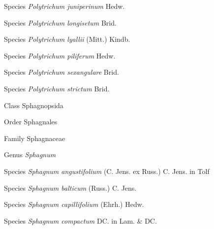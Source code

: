 \documentclass[9pt, article]{memoir}
\begin{document}
\begin{multicols}{2}
\vspace{6pt}\noindent\hspace{36pt}Species \textit{Polytrichum juniperinum} Hedw.


\vspace{6pt}\noindent\hspace{36pt}Species \textit{Polytrichum longisetum} Brid.


\vspace{6pt}\noindent\hspace{36pt}Species \textit{Polytrichum lyallii} (Mitt.) Kindb.


\vspace{6pt}\noindent\hspace{36pt}Species \textit{Polytrichum piliferum} Hedw.


\vspace{6pt}\noindent\hspace{36pt}Species \textit{Polytrichum sexangulare} Brid.


\vspace{6pt}\noindent\hspace{36pt}Species \textit{Polytrichum strictum} Brid.


\vspace{6pt}\noindent\hspace{12pt}Class Sphagnopsida


\vspace{6pt}\noindent\hspace{18pt}Order Sphagnales


\vspace{6pt}\noindent\hspace{24pt}Family Sphagnaceae


\vspace{6pt}\noindent\hspace{30pt}Genus \textit{Sphagnum}


\vspace{6pt}\noindent\hspace{36pt}Species \textit{Sphagnum angustifolium} (C. Jens. ex Russ.) C. Jens. in Tolf


\vspace{6pt}\noindent\hspace{36pt}Species \textit{Sphagnum balticum} (Russ.) C. Jens.


\vspace{6pt}\noindent\hspace{36pt}Species \textit{Sphagnum capillifolium} (Ehrh.) Hedw.


\vspace{6pt}\noindent\hspace{36pt}Species \textit{Sphagnum compactum} DC. in Lam. \& DC.



\end{multicols}
\end{document}
